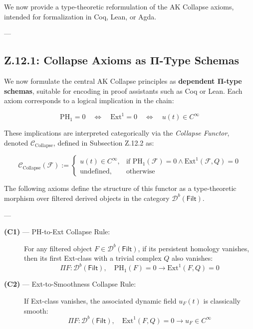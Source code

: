 \documentclass[11pt]{article}
\begin{document}
\begin{axiom}
\begin{axiom}
{{We now provide a type-theoretic reformulation of the AK Collapse axioms, intended for formalization in Coq, Lean, or Agda.

---

\subsection*{Z.12.1: Collapse Axioms as Π-Type Schemas}

We now formulate the central AK Collapse principles as \textbf{dependent Π-type schemas},  
suitable for encoding in proof assistants such as Coq or Lean. Each axiom corresponds to a  
logical implication in the chain:

\[
\mathrm{PH}_1 = 0 \quad \Leftrightarrow \quad \mathrm{Ext}^1 = 0 \quad \Leftrightarrow \quad u(t) \in C^\infty
\]

These implications are interpreted categorically via the \emph{Collapse Functor},  
denoted \( \mathcal{C}_{\text{Collapse}} \), defined in Subsection Z.12.2 as:

\[
\mathcal{C}_{\text{Collapse}}(\mathcal{F}) := 
\begin{cases}
  u(t) \in C^\infty, & \text{if } \mathrm{PH}_1(\mathcal{F}) = 0 \land \mathrm{Ext}^1(\mathcal{F}, Q) = 0 \\
  \text{undefined}, & \text{otherwise}
\end{cases}
\]

The following axioms define the structure of this functor as a type-theoretic morphism  
over filtered derived objects in the category \( \mathcal{D}^b(\mathsf{Filt}) \).

---

\begin{description}

  \item[\textbf{(C1)} — PH-to-Ext Collapse Rule:]  
  For any filtered object \( F \in \mathcal{D}^b(\mathsf{Filt}) \), if its persistent homology vanishes,  
  then its first Ext-class with a trivial complex \( Q \) also vanishes:
  \[
  \Pi F : \mathcal{D}^b(\mathsf{Filt}),\quad \mathrm{PH}_1(F) = 0 \rightarrow \mathrm{Ext}^1(F, Q) = 0
  \]

  \item[\textbf{(C2)} — Ext-to-Smoothness Collapse Rule:]  
  If Ext-class vanishes, the associated dynamic field \( u_F(t) \) is classically smooth:
  \[
  \Pi F : \mathcal{D}^b(\mathsf{Filt}),\quad \mathrm{Ext}^1(F, Q) = 0 \rightarrow u_F \in C^\infty
  \]


\end{description}}}
\end{axiom}
\end{axiom}
\end{document}
